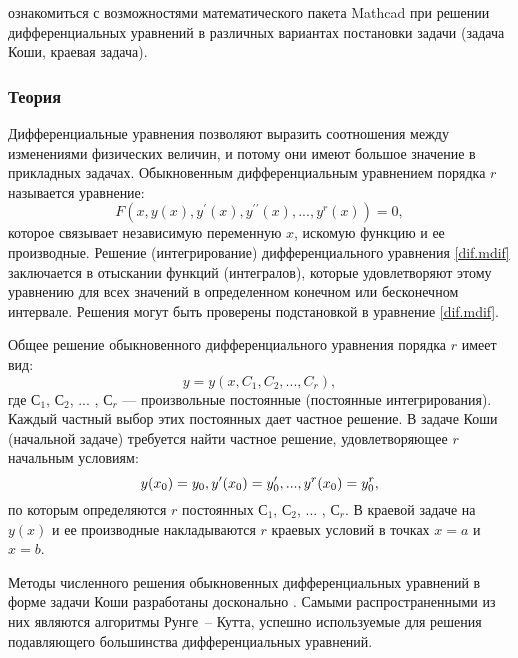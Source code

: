 
\goal ознакомиться с возможностями математического пакета Mathcad при решении дифференциальных уравнений в различных вариантах постановки задачи (задача Коши, краевая задача).

\subsubsection*{Теория}

Дифференциальные уравнения позволяют выразить соотношения между изменениями физических величин, и потому они имеют большое значение в прикладных задачах. Обыкновенным дифференциальным уравнением порядка $r$ называется уравнение:
\begin{equation} \label{dif.mdif}
	F(x,y(x),y^\prime(x),y^{\prime \prime}(x), ... , y^r(x))=0,
\end{equation}
которое связывает независимую переменную $x$, искомую функцию и ее производные. Решение (интегрирование) дифференциального уравнения \ref{dif.mdif} заключается в отыскании функций (интегралов), которые удовлетворяют этому уравнению для всех значений  в определенном конечном  или бесконечном интервале. Решения могут быть проверены подстановкой в уравнение \ref{dif.mdif}.

Общее решение обыкновенного дифференциального уравнения порядка $r$ имеет вид:
\begin{equation}
	y=y(x,C_1,C_2, ... ,C_r),
\end{equation}
где $С_1$, $С_2$, ... , $С_r$ --- произвольные постоянные (постоянные интегрирования). Каждый частный выбор этих постоянных дает частное решение. В задаче Коши (начальной задаче) требуется найти частное решение, удовлетворяющее $r$ начальным условиям:
\begin{equation}
	y(x_0)=y_0, \newline
	y^{\prime}(x_0)=y_0^{\prime}, ... , y^{r}(x_0)=y^r_0,
\end{equation}
по которым определяются $r$ постоянных $С_1$, $С_2$, ... , $С_r$. В краевой задаче на $y(x)$ и ее производные накладываются $r$ краевых условий в точках $x=a$ и $x=b$.

Методы численного решения обыкновенных дифференциальных уравнений в форме задачи Коши разработаны досконально \cite{shipachevvs2005}. Самыми распространенными из них являются алгоритмы Рунге~-- Кутта, успешно используемые для решения подавляющего большинства дифференциальных уравнений. 

